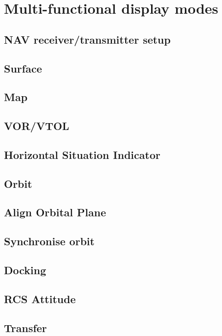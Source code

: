 \documentclass[Orbiter User Manual.tex]{subfiles}
\begin{document}
\section{Multi-functional display modes}

\subsection{NAV receiver/transmitter setup}

\subsection{Surface}

\subsection{Map}

\subsection{VOR/VTOL}

\subsection{Horizontal Situation Indicator}

\subsection{Orbit}

\subsection{Align Orbital Plane}

\subsection{Synchronise orbit}

\subsection{Docking}

\subsection{RCS Attitude}

\subsection{Transfer}
\end{document}
